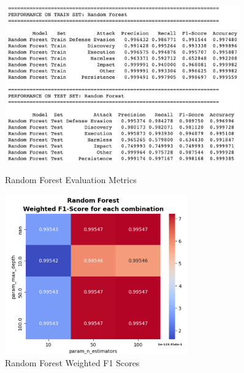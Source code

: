 \begin{figure}[H]
            \begin{minipage}{\textwidth}
                \begin{minipage}[c]{0.48\textwidth}
                    \centering
                    \includegraphics[width=0.9\textwidth]{../figures/plots/section2/Random_Forest_evaluation_metrics_1.png}
                    \caption{Random Forest Evaluation Metrics}
                    \label{fig:rf_em_base}
                \end{minipage}%
                \hfill%
                \begin{minipage}[c]{0.48\textwidth}
                    \centering
                    \includegraphics[width=0.7\textwidth]{../figures/plots/section2/weighted_f1_score_for_each_combination_of_parameters_random_forest.png}
                    \caption{Random Forest Weighted F1 Scores}
                    \label{fig:rf_f1_tuning}
                \end{minipage}
            \end{minipage}
            

\end{figure}
